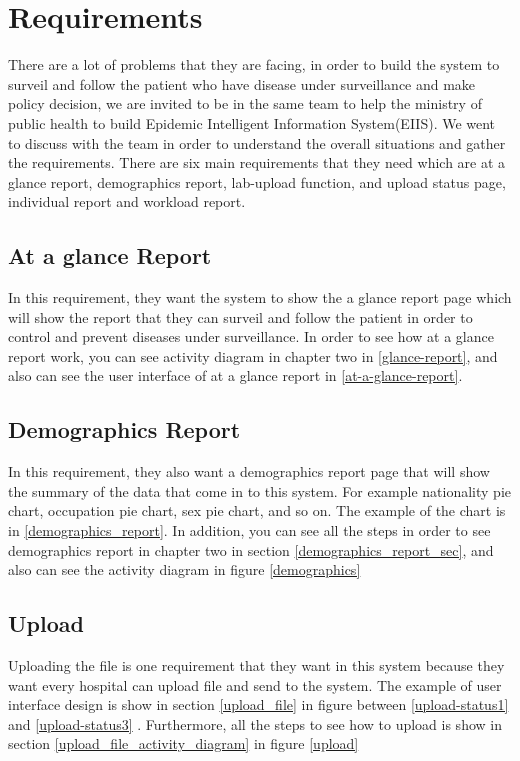 \chapter{Requirements}

    There are a lot of problems that they are facing, in order to build the system to surveil and follow the patient who have disease under surveillance and make policy decision, we are invited to be in the same team to help the ministry of public health to build Epidemic Intelligent Information System(EIIS). We went to discuss with the team in order to understand the overall situations and gather the requirements. There are six main requirements that they need which are at a glance report, demographics report, lab-upload function, and upload status page, individual report and workload report. 
    
\section{At a glance Report}
    In this requirement, they want the system to show the a glance report page which will show the report that they can surveil and follow the patient in order to control and prevent diseases under surveillance.
    In order to see how at a glance report work, you can see activity diagram in chapter two in  \ref{glance-report}, and also can see the user interface of at a glance report in \ref{at-a-glance-report}.

        
\section{Demographics Report}
    In this requirement, they also want a demographics report page that will show the summary of the data that come in to this system. For example nationality pie chart, occupation pie chart, sex pie chart, and so on. The example of the chart is in \ref{demographics_report}. In addition, you can see all the steps in order to see demographics report in chapter two in section \ref{demographics_report_sec}, and also can see the activity diagram in figure \ref{demographics}
        
\section{Upload}
    Uploading the file is one requirement that they want in this system because they want every hospital can upload file and send to the system. The example of user interface design is show in section \ref{upload_file} in figure between \ref{upload-status1} and \ref{upload-status3} . Furthermore, all the steps to see how to upload is show in section \ref{upload_file_activity_diagram} in figure \ref{upload}

